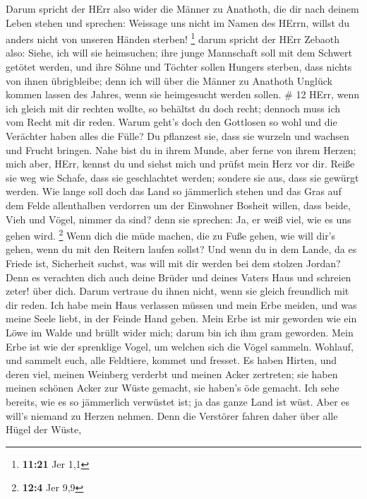  Darum spricht der HErr also wider die Männer zu Anathoth,
die dir nach deinem Leben stehen und sprechen: Weissage uns nicht im
Namen des HErrn, willst du anders nicht von unseren Händen sterben!
\footnote{\textbf{11:21} Jer 1,1}  darum spricht der HErr
Zebaoth also: Siehe, ich will sie heimsuchen; ihre junge Mannschaft soll
mit dem Schwert getötet werden, und ihre Söhne und Töchter sollen
Hungers sterben, dass nichts von ihnen übrigbleibe;  denn
ich will über die Männer zu Anathoth Unglück kommen lassen des Jahres,
wenn sie heimgesucht werden sollen. \# 12  HErr, wenn ich
gleich mit dir rechten wollte, so behältst du doch recht; dennoch muss
ich vom Recht mit dir reden. Warum geht's doch den Gottlosen so wohl und
die Verächter haben alles die Fülle?  Du pflanzest sie, dass
sie wurzeln und wachsen und Frucht bringen. Nahe bist du in ihrem Munde,
aber ferne von ihrem Herzen;  mich aber, HErr, kennst du und
siehst mich und prüfst mein Herz vor dir. Reiße sie weg wie Schafe, dass
sie geschlachtet werden; sondere sie aus, dass sie gewürgt werden.
 Wie lange soll doch das Land so jämmerlich stehen und das
Gras auf dem Felde allenthalben verdorren um der Einwohner Bosheit
willen, dass beide, Vieh und Vögel, nimmer da sind? denn sie sprechen:
Ja, er weiß viel, wie es uns gehen wird. \footnote{\textbf{12:4} Jer 9,9}
 Wenn dich die müde machen, die zu Fuße gehen, wie will
dir's gehen, wenn du mit den Reitern laufen sollst? Und wenn du in dem
Lande, da es Friede ist, Sicherheit suchst, was will mit dir werden bei
dem stolzen Jordan?  Denn es verachten dich auch deine
Brüder und deines Vaters Haus und schreien zeter! über dich. Darum
vertraue du ihnen nicht, wenn sie gleich freundlich mit dir reden.
 Ich habe mein Haus verlassen müssen und mein Erbe meiden,
und was meine Seele liebt, in der Feinde Hand geben.  Mein
Erbe ist mir geworden wie ein Löwe im Walde und brüllt wider mich; darum
bin ich ihm gram geworden.  Mein Erbe ist wie der sprenklige
Vogel, um welchen sich die Vögel sammeln. Wohlauf, und sammelt euch,
alle Feldtiere, kommet und fresset.  Es haben Hirten, und
deren viel, meinen Weinberg verderbt und meinen Acker zertreten; sie
haben meinen schönen Acker zur Wüste gemacht, sie haben's öde gemacht.
 Ich sehe bereits, wie es so jämmerlich verwüstet ist; ja
das ganze Land ist wüst. Aber es will's niemand zu Herzen nehmen.
 Denn die Verstörer fahren daher über alle Hügel der Wüste,
